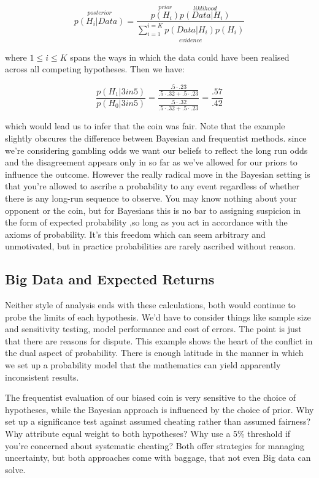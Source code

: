 \documentclass[10pt,a4paper,notitlepage, twocolumn]{article}
\begin{document}
$$ \overset{posterior}{p(H_{i} | Data)} = \frac{\overset{prior}{p(H_{i})}\overset{liklihood}{p(Data | H_{i})}}{\underset{evidence}{\sum_{i=1}^{i =K} p(Data | H_{i})p(H_i)}}$$

where $ 1 \leq i \leq K$ spans the ways in which the data could have been realised across all competing hypotheses. Then we have:

$$ \frac{p(H_1 | 3 in 5)}{p(H_{0} | 3 in 5)} = \frac{\frac{.5\cdot .23}{.5\cdot .32 + .5 \cdot .23}}{\frac{.5\cdot .32}{.5\cdot .32 + .5 \cdot .23}} = \frac{.57}{.42} $$

which would lead us to infer that the coin was fair. Note that the example slightly obscures the difference between Bayesian and frequentist methods. since we're considering gambling odds we want our beliefs to reflect the long run odds and the disagreement appears only in so far as we've allowed for our priors to influence the outcome. However the really radical move in the Bayesian setting is that you're allowed to ascribe a probability to any event regardless of whether there is any long-run sequence to observe. You may know nothing about your opponent or the coin, but for Bayesians this is no bar to assigning suspicion in the form of expected probability ,so long as you act in accordance with the axioms of probability. It's this freedom which can seem arbitrary and unmotivated, but in practice probabilities  are rarely ascribed without reason.

\raggedbottom

\subsection*{Big Data and Expected Returns}
Neither style of analysis ends with these calculations, both would continue to probe the limits of each hypothesis. We'd have to consider things like sample size and sensitivity testing, model performance and cost of errors. The point is just that there are reasons for dispute. This example shows the heart of the conflict in the dual aspect of probability. There is enough latitude in the manner in which we set up a probability model that the mathematics can yield apparently inconsistent results. 

The frequentist evaluation of our biased coin is very sensitive to the choice of hypotheses, while the Bayesian approach is influenced by the choice of prior. Why set up a significance test against assumed cheating rather than assumed fairness? Why attribute equal weight to both hypotheses? Why use a 5\% threshold if you're concerned about systematic cheating? Both offer strategies for managing uncertainty, but both approaches come with baggage, that not even Big data can solve.
\newline 
\end{document}

